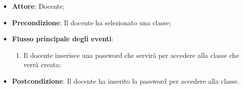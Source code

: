\documentclass[12pt,a4paper]{article}
\begin{document}
\begin{itemize}

\item \textbf{Attore}: Docente; 
\item \textbf{Precondizione}: Il docente ha selezionato una classe;

\item \textbf{Flusso principale degli eventi}:
\begin{enumerate}
	\item Il docente inserisce una password che servirà per accedere alla classe che verrà creata;
	
\end{enumerate}
\item \textbf{Postcondizione}: Il docente ha inserito la password per accedere alla classe.
\end{itemize}
\hypertarget{UC6}{}
\end{document}
